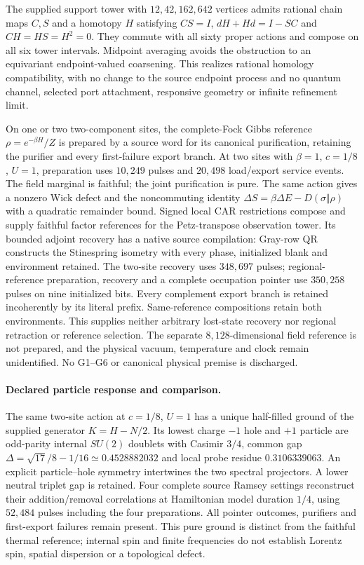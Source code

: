 The supplied support tower with $12,42,162,642$ vertices admits rational
chain maps $C,S$ and a homotopy $H$ satisfying $CS=I$,
$dH+Hd=I-SC$ and $CH=HS=H^2=0$. They commute with all sixty proper actions
and compose on all six tower intervals. Midpoint averaging avoids the
obstruction to an equivariant endpoint-valued coarsening. This realizes
rational homology compatibility, with no change to the source endpoint
process and no quantum channel, selected port attachment, responsive
geometry or infinite refinement limit.

On one or two two-component sites, the complete-Fock Gibbs reference
$\rho=e^{-\beta H}/Z$ is prepared by a source word for its canonical
purification, retaining the purifier and every first-failure export branch.
At two sites with $\beta=1$, $c=1/8$, $U=1$, preparation uses $10{,}249$
pulses and $20{,}498$ load/export service events. The field marginal is
faithful; the joint purification is pure. The same action gives a nonzero
Wick defect and the noncommuting identity
$\Delta S=\beta\Delta E-D(\sigma\Vert\rho)$ with a quadratic remainder
bound. Signed local CAR restrictions compose and supply faithful factor
references for the Petz-transpose observation tower. Its bounded adjoint
recovery has a native source compilation: Gray-row QR constructs the
Stinespring isometry with every phase, initialized blank and environment
retained. The two-site recovery uses $348{,}697$ pulses; regional-reference
preparation, recovery and a complete occupation pointer use $350{,}258$
pulses on nine initialized bits. Every complement export branch is retained
incoherently by its literal prefix. Same-reference compositions retain both
environments. This supplies neither arbitrary lost-state recovery nor
regional retraction or reference selection. The separate $8{,}128$-dimensional field
reference is not prepared, and the physical vacuum, temperature and clock
remain unidentified. No G1--G6 or canonical physical premise is discharged.


\paragraph{Declared particle response and comparison.}
The same two-site action at $c=1/8$, $U=1$ has a unique half-filled ground
of the supplied generator $K=H-N/2$. Its lowest charge $-1$ hole and $+1$
particle are odd-parity internal $SU(2)$ doublets with Casimir $3/4$,
common gap $\Delta=\sqrt{17}/8-1/16\simeq0.4528882032$ and local probe
residue $0.3106339063$. An explicit particle--hole symmetry intertwines
the two spectral projectors. A lower neutral triplet gap is retained.
Four complete source Ramsey settings reconstruct their addition/removal
correlations at Hamiltonian model duration $1/4$, using $52{,}484$ pulses
including the four preparations. All pointer outcomes, purifiers and
first-export failures remain present. This pure ground is distinct from
the faithful thermal reference; internal spin and finite frequencies do
not establish Lorentz spin, spatial dispersion or a topological defect.

